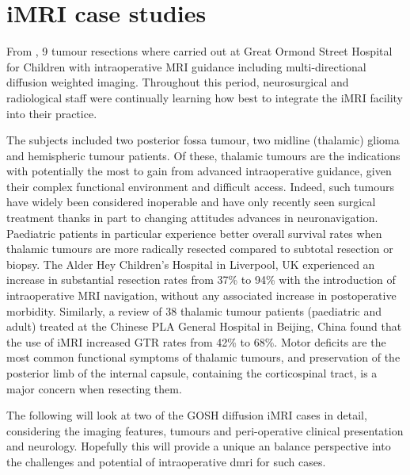 
\clearpage
\section{iMRI case studies}\label{sec:case}

From , 9  tumour resections where carried out at Great Ormond Street Hospital for Children with intraoperative MRI guidance including multi-directional diffusion weighted imaging.
Throughout this period, neurosurgical and radiological staff were continually learning how best to integrate the iMRI facility into their practice.

The subjects included two posterior fossa tumour, two midline (thalamic) glioma and  hemispheric tumour patients.
Of these, thalamic tumours are the indications with potentially the most to gain from advanced intraoperative guidance, given their complex functional environment and difficult access.
Indeed, such tumours have widely been considered inoperable and have only recently seen surgical treatment thanks in part to changing attitudes\autocite{Souweidane1996,Puget2007} advances in neuronavigation.\autocite{Sunderland2021}
Paediatric patients in particular\autocite{Ferroli2023} experience better overall survival rates when thalamic tumours are more radically resected compared to subtotal resection or biopsy.\autocite{Cinalli2018a}
The Alder Hey Children's Hospital in Liverpool, UK experienced an increase in substantial resection  rates from 37\% to 94\% with the introduction of intraoperative MRI navigation, without any associated increase in postoperative morbidity.\autocite{Sunderland2021}
Similarly, a review of 38 thalamic tumour patients (paediatric and adult) treated at the Chinese PLA General Hospital in Beijing, China found that the use of iMRI increased GTR rates from 42\% to 68\%.\autocite{Zheng2016}
Motor deficits are the most common functional symptoms of thalamic tumours,\autocite{Puget2007, Zheng2016, Palmisciano2021} and preservation of the posterior limb of the internal capsule, containing the corticospinal tract, is a major concern when resecting them.

The following will look at two of the GOSH diffusion iMRI cases in detail, considering the imaging features, tumours and peri-operative clinical presentation and neurology.
Hopefully this will provide a unique an balance perspective into the challenges and potential of intraoperative \gls{dmri} for such cases.


